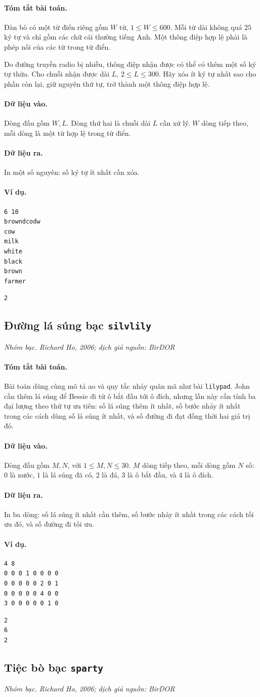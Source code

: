 \documentclass[11pt]{article}
\newcommand{\problem}[4]{%
  \subsection[#1 (#2)]{#1 \hfill {\normalsize\texttt{#2}}}%
  \noindent\textit{#3. #4}\par\smallskip
}
\newcommand{\iosec}[1]{\paragraph{#1}}
\begin{document}
\iosec{Tóm tắt bài toán.}
Đàn bò có một từ điển riêng gồm \(W\) từ, \(1\le W\le 600\). Mỗi từ dài không
quá \(25\) ký tự và chỉ gồm các chữ cái thường tiếng Anh. Một thông điệp hợp
lệ phải là phép nối của các từ trong từ điển.

Do đường truyền radio bị nhiễu, thông điệp nhận được có thể có thêm một số
ký tự thừa. Cho chuỗi nhận được dài \(L\), \(2\le L\le 300\). Hãy xóa ít ký
tự nhất sao cho phần còn lại, giữ nguyên thứ tự, trở thành một thông điệp hợp
lệ.

\iosec{Dữ liệu vào.}
Dòng đầu gồm \(W,L\). Dòng thứ hai là chuỗi dài \(L\) cần xử lý. \(W\) dòng
tiếp theo, mỗi dòng là một từ hợp lệ trong từ điển.

\iosec{Dữ liệu ra.}
In một số nguyên: số ký tự ít nhất cần xóa.

\iosec{Ví dụ.}
\begin{verbatim}
6 10
browndcodw
cow
milk
white
black
brown
farmer
\end{verbatim}

\begin{verbatim}
2
\end{verbatim}

\problem{Đường lá súng bạc}{silvlily}{Nhóm bạc}{Richard Ho, 2006; dịch giả nguồn: BirDOR}

\iosec{Tóm tắt bài toán.}
Bài toán dùng cùng mô tả ao và quy tắc nhảy quân mã như bài \texttt{lilypad}.
John cần thêm lá súng để Bessie đi từ ô bắt đầu tới ô đích, nhưng lần này cần
tính ba đại lượng theo thứ tự ưu tiên: số lá súng thêm ít nhất, số bước nhảy
ít nhất trong các cách dùng số lá súng ít nhất, và số đường đi đạt đồng thời
hai giá trị đó.

\iosec{Dữ liệu vào.}
Dòng đầu gồm \(M,N\), với \(1\le M,N\le 30\). \(M\) dòng tiếp theo, mỗi dòng
gồm \(N\) số: \(0\) là nước, \(1\) là lá súng đã có, \(2\) là đá, \(3\) là ô
bắt đầu, và \(4\) là ô đích.

\iosec{Dữ liệu ra.}
In ba dòng: số lá súng ít nhất cần thêm, số bước nhảy ít nhất trong các cách
tối ưu đó, và số đường đi tối ưu.

\iosec{Ví dụ.}
\begin{verbatim}
4 8
0 0 0 1 0 0 0 0
0 0 0 0 0 2 0 1
0 0 0 0 0 4 0 0
3 0 0 0 0 0 1 0
\end{verbatim}

\begin{verbatim}
2
6
2
\end{verbatim}

\problem{Tiệc bò bạc}{sparty}{Nhóm bạc}{Richard Ho, 2006; dịch giả nguồn: BirDOR}
\end{document}
